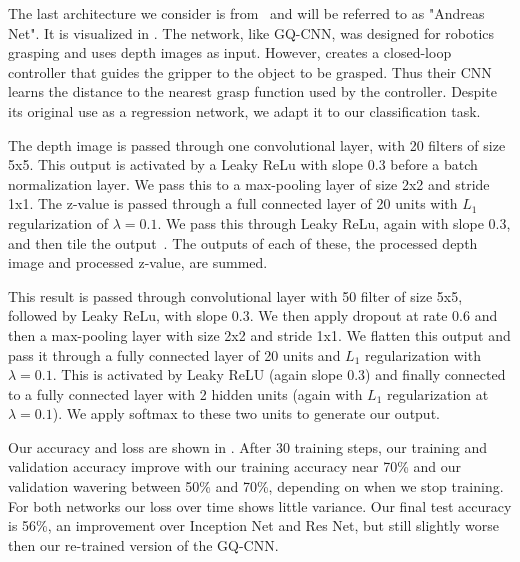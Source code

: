 The last architecture we consider is from~\cite{viereck2017learning} and will be referred to as "Andreas Net". 
It is visualized in . 
The network, like GQ-CNN, was designed for robotics grasping and uses depth images as input. 
However, \cite{viereck2017learning} creates a closed-loop controller that guides the gripper to the object to be grasped. 
Thus their CNN learns the distance to the nearest grasp function used by the controller. 
Despite its original use as a regression network, we adapt it to our classification task. 

The depth image is passed through one convolutional layer, with 20 filters of size 5x5. 
This output is activated by a Leaky ReLu with slope 0.3 before a batch normalization layer. 
We pass this to a max-pooling layer of size 2x2 and stride 1x1. 
The z-value is passed through a full connected layer of 20 units with $L_{1}$ regularization of $\lambda=0.1$.
We pass this through Leaky ReLu, again with slope 0.3, and then tile the output~\cite{ngiam2010tiled}.
The outputs of each of these, the processed depth image and processed z-value, are summed.

This result is passed through convolutional layer with 50 filter of size 5x5, followed by Leaky ReLu, with slope 0.3. 
We then apply dropout at rate 0.6 and then a max-pooling layer with size 2x2 and stride 1x1. 
We flatten this output and pass it through a fully connected layer of 20 units and $L_{1}$ regularization with $\lambda = 0.1$. 
This is activated by Leaky ReLU (again slope 0.3) and finally connected to a fully connected layer with 2 hidden units (again with $L_{1}$ regularization at $\lambda=0.1$). 
We apply softmax to these two units to generate our output. 


Our accuracy and loss are shown in . 
After 30 training steps, our training and validation accuracy improve with our training accuracy near 70\% and our validation wavering between 50\% and 70\%, depending on when we stop training. 
For both networks our loss over time shows little variance. 
Our final test accuracy is 56\%, an improvement over Inception Net and Res Net, but still slightly worse then our re-trained version of the GQ-CNN. 

